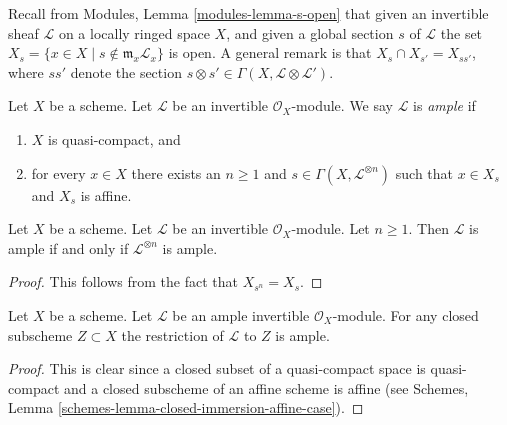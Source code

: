 \noindent
Recall from Modules, Lemma \ref{modules-lemma-s-open}
that given an invertible sheaf $\mathcal{L}$ on a locally ringed
space $X$, and given a global section $s$ of $\mathcal{L}$
the set $X_s = \{x \in X \mid s \not \in \mathfrak m_x\mathcal{L}_x\}$
is open. A general remark is that
$X_s \cap X_{s'} = X_{ss'}$, where $ss'$ denote
the section $s \otimes s' \in \Gamma(X, \mathcal{L} \otimes \mathcal{L}')$.

\begin{definition}
\label{definition-ample}
\begin{reference}
\cite[II Definition 4.5.3]{EGA}
\end{reference}
Let $X$ be a scheme.
Let $\mathcal{L}$ be an invertible $\mathcal{O}_X$-module.
We say $\mathcal{L}$ is {\it ample} if
\begin{enumerate}
\item $X$ is quasi-compact, and
\item for every $x \in X$ there exists an $n \geq 1$
and $s \in \Gamma(X, \mathcal{L}^{\otimes n})$ such
that $x \in X_s$ and $X_s$ is affine.
\end{enumerate}
\end{definition}

\begin{lemma}
\label{lemma-ample-power-ample}
\begin{reference}
\cite[II Proposition 4.5.6(i)]{EGA}
\end{reference}
Let $X$ be a scheme. Let $\mathcal{L}$ be an invertible $\mathcal{O}_X$-module.
Let $n \geq 1$. Then $\mathcal{L}$ is ample if and only if
$\mathcal{L}^{\otimes n}$ is ample.
\end{lemma}

\begin{proof}
This follows from the fact that $X_{s^n} = X_s$.
\end{proof}

\begin{lemma}
\label{lemma-ample-on-closed}
Let $X$ be a scheme.
Let $\mathcal{L}$ be an ample invertible $\mathcal{O}_X$-module.
For any closed subscheme $Z \subset X$ the restriction of
$\mathcal{L}$ to $Z$ is ample.
\end{lemma}

\begin{proof}
This is clear since a closed subset of a quasi-compact space is quasi-compact
and a closed subscheme of an affine scheme is affine (see
Schemes, Lemma \ref{schemes-lemma-closed-immersion-affine-case}).
\end{proof}

